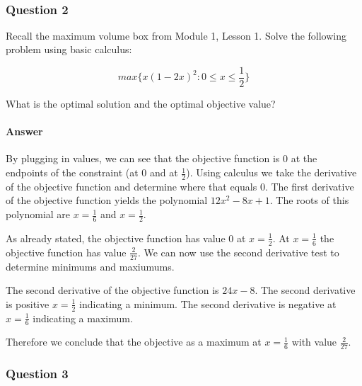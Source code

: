 \documentclass[11pt]{article}
\begin{document}
    \begin{center}
    \end{center}
    { \hspace*{\fill} \\}
    
    \hypertarget{question-2}{%
\subsubsection{Question 2}\label{question-2}}

Recall the maximum volume box from Module 1, Lesson 1. Solve the
following problem using basic calculus:

\[max \{ x(1 − 2x)^2 : 0 \leq x \leq \frac{1}{2} \}\]

What is the optimal solution and the optimal objective value?

\hypertarget{answer}{%
\paragraph{Answer}\label{answer}}

By plugging in values, we can see that the objective function is 0 at
the endpoints of the constraint (at 0 and at \(\frac{1}{2}\)). Using
calculus we take the derivative of the objective function and determine
where that equals 0. The first derivative of the objective function
yields the polynomial \(12 x^2 - 8x + 1\). The roots of this polynomial
are \(x = \frac{1}{6}\) and \(x = \frac{1}{2}\).

As already stated, the objective function has value 0 at
\(x = \frac{1}{2}\). At \(x = \frac{1}{6}\) the objective function has
value \(\frac{2}{27}\). We can now use the second derivative test to
determine minimums and maxiumums.

The second derivative of the objective function is \(24x - 8\). The
second derivative is positive \(x = \frac{1}{2}\) indicating a minimum.
The second derivative is negative at \(x = \frac{1}{6}\) indicating a
maximum.

Therefore we conclude that the objective as a maximum at
\(x = \frac{1}{6}\) with value \(\frac{2}{27}\).

    \hypertarget{question-3}{%
\subsubsection{Question 3}\label{question-3}}
\end{document}
